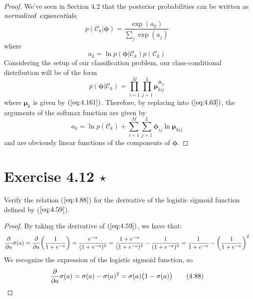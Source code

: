 \begin{proof}
    We've seen in Section 4.2 that the posterior probabilities
    can be written as $\emph{normalized}$ $\emph{exponentials}$:
    \begin{equation*}
        p(\mathcal{C}_k | \bm{\phi}) 
        = \frac{\exp(a_k)}{\sum_{j} \exp(a_j)}
        \tag{4.62}\label{eq:4.62}
    \end{equation*}
    where
    \begin{equation*}
        a_k = \ln p(\bm{\phi} | \mathcal{C}_k)p(\mathcal{C}_k)
        \tag{4.63}\label{eq:4.63}
    \end{equation*}
    Considering the setup of our classification problem,
    our class-conditional distribution will be of the form
    \[
        p(\bm{\phi} | \mathcal{C}_k) 
        = \prod_{i = 1}^M \prod_{j = 1}^L
            \bm{\mu}_{kij}^{\bm{\phi}_{ij}}
    \] 
    where $\bm{\mu}_k$ is given by $(\ref{eq:4.161})$. 
    Therefore,
    by replacing into $(\ref{eq:4.63})$, the arguments
    of the softmax function are given by
    \[
        a_k = \ln p(\mathcal{C}_k) 
        + \sum_{i=1}^{M} \sum_{j=1}^{L} \bm{\phi}_{ij} \ln \bm{\mu}_{kij} 
    \] 
    and are obviously linear functions of the components
    of $\bm{\phi}$.
\end{proof}

\section*{Exercise 4.12 $\star$}
Verify the relation ($\ref{eq:4.88}$) for the derivative of the logistic sigmoid
function defined by ($\ref{eq:4.59}$).

\vspace{1em}

\begin{proof}
    By taking the derivative of $(\ref{eq:4.59})$, we have that: 
    \[
        \pdv{a} \sigma(a) 
        = \pdv{a}\bigg(\frac{1}{1 + e^{-a}}\bigg)
        = \frac{e^{-a}}{(1 + e^{-a})^2}
        = \frac{1 + e^{-a}}{(1 + e^{-a})^2} - \frac{1}{(1 + e^{-a})^2} 
        = \frac{1}{1 + e^{-a}} - \bigg(\frac{1}{1 + e^{-a}}\bigg)^2
    \] 
    We recognize the expression of the logistic sigmoid function, so
    \begin{equation*}
        \pdv{a} \sigma(a) = \sigma(a) - \sigma(a)^2 = \sigma(a) \big(1 - \sigma(a)\big)
        \tag{4.88}\label{eq:4.88}
    \end{equation*}
\end{proof}

